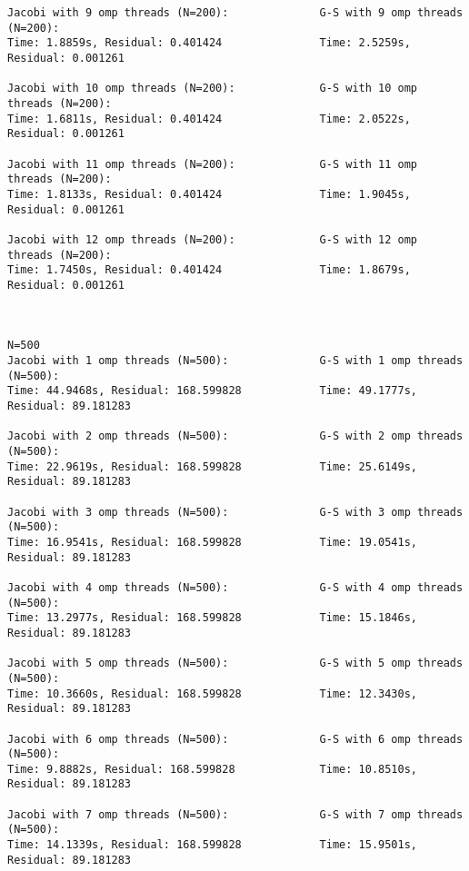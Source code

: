 \documentclass{article}
\begin{document}
\begin{lstlisting}
Jacobi with 9 omp threads (N=200):              G-S with 9 omp threads (N=200):
Time: 1.8859s, Residual: 0.401424               Time: 2.5259s, Residual: 0.001261
                        
Jacobi with 10 omp threads (N=200):             G-S with 10 omp threads (N=200):
Time: 1.6811s, Residual: 0.401424               Time: 2.0522s, Residual: 0.001261
                        
Jacobi with 11 omp threads (N=200):             G-S with 11 omp threads (N=200):
Time: 1.8133s, Residual: 0.401424               Time: 1.9045s, Residual: 0.001261
                        
Jacobi with 12 omp threads (N=200):             G-S with 12 omp threads (N=200):
Time: 1.7450s, Residual: 0.401424               Time: 1.8679s, Residual: 0.001261
                        
                        
                        
N=500                        
Jacobi with 1 omp threads (N=500):              G-S with 1 omp threads (N=500):
Time: 44.9468s, Residual: 168.599828            Time: 49.1777s, Residual: 89.181283
                        
Jacobi with 2 omp threads (N=500):              G-S with 2 omp threads (N=500):
Time: 22.9619s, Residual: 168.599828            Time: 25.6149s, Residual: 89.181283
                        
Jacobi with 3 omp threads (N=500):              G-S with 3 omp threads (N=500):
Time: 16.9541s, Residual: 168.599828            Time: 19.0541s, Residual: 89.181283
                        
Jacobi with 4 omp threads (N=500):              G-S with 4 omp threads (N=500):
Time: 13.2977s, Residual: 168.599828            Time: 15.1846s, Residual: 89.181283
                        
Jacobi with 5 omp threads (N=500):              G-S with 5 omp threads (N=500):
Time: 10.3660s, Residual: 168.599828            Time: 12.3430s, Residual: 89.181283
                        
Jacobi with 6 omp threads (N=500):              G-S with 6 omp threads (N=500):
Time: 9.8882s, Residual: 168.599828             Time: 10.8510s, Residual: 89.181283
                        
Jacobi with 7 omp threads (N=500):              G-S with 7 omp threads (N=500):
Time: 14.1339s, Residual: 168.599828            Time: 15.9501s, Residual: 89.181283
                        

\end{lstlisting}
\end{document}
